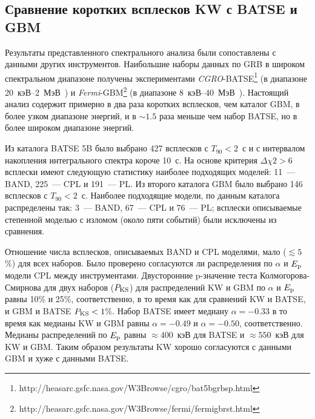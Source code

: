 \subsection{Сравнение коротких всплесков KW с BATSE и GBM}
Результаты представленного спектрального анализа были сопоставлены с данными
других инструментов.
Наибольшие наборы данных по GRB в широком спектральном диапазоне получены экспериментами
\textit{CGRO}-BATSE\footnote{http://heasarc.gsfc.nasa.gov/W3Browse/cgro/bat5bgrbsp.html}
(в диапазоне 20~кэВ--2~МэВ~\citep{Goldstein_2013ApJS}) и 
\textit{Fermi}-GBM\footnote{http://heasarc.gsfc.nasa.gov/W3Browse/fermi/fermigbrst.html}
(в диапазоне 8~кэВ--40~МэВ~\citep{Gruber_2014ApJS}). 
Настоящий анализ содержит примерно в два раза коротких всплесков, чем каталог GBM, 
в более узком диапазоне энергий, и в $\sim 1.5 $ раза меньше чем набор BATSE, 
но в более широком диапазоне энергий.

Из каталога BATSE 5B было выбрано 427 всплесков с $T_{90}<2$~с и с интервалом 
накопления интегрального спектра короче 10~с. На основе критерия $\Delta \chi2>6$
всплески имеют следующую статистику наиболее подходящих моделей:
11~--- BAND, 225~--- CPL и 191~--- PL.
Из второго каталога GBM было выбрано 146 всплесков с $T_{90}<2$~с. Наиболее подходящие модели,
по данным каталога распределены так: 3~--- BAND, 67~--- CPL и 76~--- PL;
всплески описываемые степенной моделью с изломом (около пяти событий) были 
исключены из сравнения.

Отношение числа всплесков, описываемых BAND и CPL моделями, мало ($\lesssim 5$\%)
для всех наборов. Было проверено согласуются ли распределения по $\alpha$ и 
$E_{\mathrm{p}}$ модели CPL между инструментами. Двусторонние p-значение 
теста Колмогорова-Смирнова для двух наборов ($P_{\mathrm{KS}}$) для распределений 
KW и GBM по $\alpha$ и $E_{\mathrm{p}}$ равны 10\% и 25\%, соответственно, в то время 
как для сравнений KW и BATSE, и GBM и BATSE $P_{\mathrm{KS}}<1$\%.
Набор BATSE имеет медиану $\alpha=-0.33$ в то время как медианы KW и GBM равны
$\alpha=-0.49$ и $\alpha=-0.50$, соответственно.
Медианы распределений по $E_{\mathrm{p}}$ равны $\approx 400$~кэВ для BATSE и 
$\approx 550$~кэВ для KW и GBM.
Таким образом результаты KW хорошо согласуются с данными GBM и хуже с данными BATSE.

